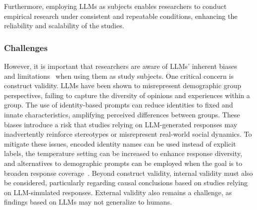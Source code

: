 Furthermore, employing LLMs as subjects enables researchers to conduct empirical research under consistent and repeatable conditions, enhancing the reliability and scalability of the studies.

\subsubsection{Challenges}

However, it is important that researchers are aware of LLMs' inherent biases~\cite{Crowell2023} and limitations~\cite{DBLP:journals/ais/HardingDLL24, DBLP:journals/corr/abs-2402-01908} when using them as study subjects. 
One critical concern is construct validity. LLMs have been shown to misrepresent demographic group perspectives, %
failing to capture the diversity of opinions and experiences within a group.
The use of identity-based prompts can reduce identities to fixed and innate characteristics, amplifying perceived differences between groups.
These biases introduce a risk that studies relying on LLM-generated responses may inadvertently reinforce stereotypes or misrepresent real-world social dynamics. To mitigate these issues, encoded identity names can be used instead of explicit labels, the temperature setting can be increased to enhance response diversity, and alternatives to demographic prompts can be employed when the goal is to broaden response coverage~\cite{DBLP:journals/ais/HardingDLL24, DBLP:journals/corr/abs-2402-01908}.
Beyond construct validity, internal validity must also be considered, particularly regarding causal conclusions based on studies relying on LLM-simulated responses.
External validity also remains a challenge, as findings based on LLMs may not generalize to humans.


